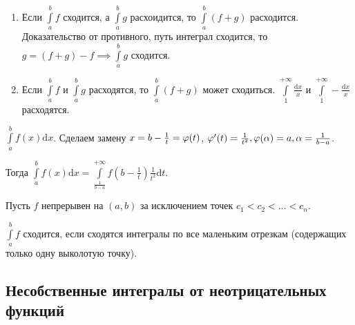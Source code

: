 \begin{remark}
    \begin{enumerate}
        \item Если  $\int\limits_a^b f$ сходится, а  $\int\limits_a^b g$ расхоидится, то  $\int\limits_a^b (f+g)$ расходится. Доказательство от противного, путь интеграл сходится, то  $g = (f+g)-f \implies \int\limits_a^b g$ сходится.
        \item Если $\int\limits_a^b f$ и  $\int\limits_a^b g$ расходятся, то  $\int\limits_a^b (f+g)$ может сходиться.  $\int\limits_1^{+\infty} \frac{\mathrm{d}x}{x}$ и $\int\limits_1^{+\infty} -\frac{\mathrm{d}x}{x}$ расходятся.
    \end{enumerate}
\end{remark}
\begin{remark}
    $\int\limits_a^b f(x) \mathrm{d}x$. Сделаем замену  $x = b - \frac{1}{t} = \varphi(t)$, $\varphi'(t) = \frac{1}{t^2}, \varphi(\alpha) = a, \alpha = \frac{1}{b-a}$.

    Тогда $\int\limits_a^b f(x) \mathrm{d}x = \int\limits_{\frac{1}{b-a}}^{+\infty} f(b-\frac{1}{t}) \frac{1}{t^2} \mathrm{d}t$.
\end{remark}

\begin{definition}
    Пусть $f$ непрерывен на  $(a, b)$ за исключением точек  $c_1 < c_2 < \ldots < c_n$.

    $\int\limits_a^b f$ сходится, если сходятся интегралы по все маленьким отрезкам (содержащих только одну выколотую точку).
\end{definition}
\subsection*{Несобственные интегралы от неотрицательных функций}

